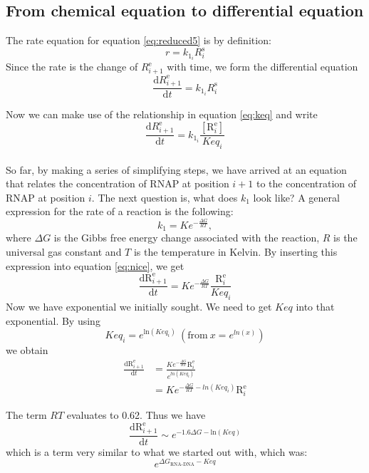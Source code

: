 \documentclass[a4paper]{article}
\newcommand{\te}[1]{\text{#1}}
\newcommand{\diff}[2]{\frac{\mathrm{d} #1}{\mathrm{d} #2}}
\begin{document}
\subsection{From chemical equation to differential equation}
The rate equation for equation \eqref{eq:reduced5} is by definition:
\begin{equation*}
	r = k_{1_i}R_i^{\text{s}}
\end{equation*}
Since the rate is the change of $R_{i+1}^{\text{e}}$ with time,
we form the differential equation
\begin{equation*}
	\diff{R_{i+1}^{\text{e}}}{t} = k_{1_i}R_i^{\text{s}}
\end{equation*}

Now we can make use of the relationship in equation \eqref{eq:keq} and write
\begin{equation}
	\diff{R_{i+1}^{\text{e}}}{t} = k_{1_i}\frac{[\te{R}_i^{\te{e}}]}{Keq_i}
	\label{eq:nice}
\end{equation}
\\
So far, by making a series of simplifying steps, we have arrived at an equation
that relates the concentration of RNAP at position $i+1$ to the concentration
of RNAP at position $i$. The next question is, what does $k_1$ look like? A
general expression for the rate of a reaction is the following:
\begin{equation*}
	k_1 = Ke^{-\frac{\Delta G}{RT}},
\end{equation*}
where $\Delta G$ is the Gibbs free energy change associated with the reaction,
$R$ is the universal gas constant and $T$ is the temperature in Kelvin. By
inserting this expression into equation \eqref{eq:nice}, we get
\begin{equation*}
	\diff{\te{R}_{i+1}^{\te{e}}}{t} = Ke^{-\frac{\Delta G}{RT}}\frac{\te{R}_i^{\te{e}}}{Keq_i}
\end{equation*}
Now we have exponential we initially sought. We need to get $Keq$ into that exponential. By using
\begin{equation*}
	Keq_i = e^{\te{ln}(Keq_i)} \ (\te{from} \ x = e^{ln(x)})
\end{equation*}
we obtain
\begin{align*}
	\diff{\te{R}_{i+1}^{\te{e}}}{t} &= \frac{Ke^{-\frac{\Delta
	G}{RT}}\te{R}_i^{\te{e}}}{e^{ln(Keq_i)}}\\
	&= Ke^{-\frac{\Delta G}{RT} - ln(Keq_i)}\te{R}_i^{\te{e}}
\end{align*}

The term $RT$ evaluates to 0.62. Thus we have 
\begin{equation}
	\diff{\te{R}_{i+1}^{\te{e}}}{t} \sim e^{-1.6\Delta G - \te{ln}(Keq)}
	\label{eq:stuff}
\end{equation}
which is a term very similar to what we started out with, which was:
\begin{equation*}
	e^{\Delta G_{\text{RNA-DNA}} - Keq}
\end{equation*}
\end{document}

